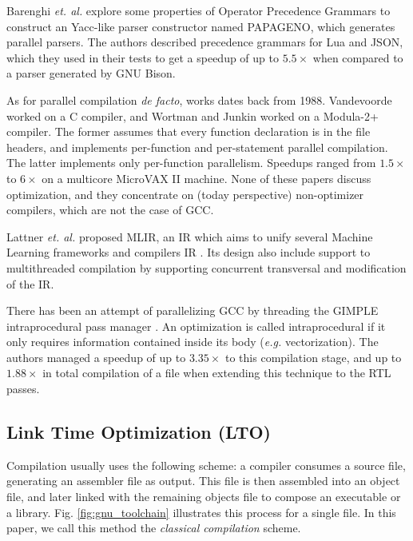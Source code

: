 \documentclass[runningheads]{llncs}
\begin{document}
Barenghi \textit{et. al.} \cite{Barenghi:2015:PPM:2839536.2840146} explore
some properties of Operator Precedence Grammars to construct an Yacc-like
parser constructor named PAPAGENO, which generates parallel parsers. The
authors described precedence grammars for Lua and JSON, which they used in
their tests to get a speedup of up to $5.5\times$ when compared to a parser
generated by GNU Bison.

As for parallel compilation \textit{de facto}, works dates back from 1988.
Vandevoorde \cite{vandevoorde1988parallel} worked on a C compiler, and Wortman
and Junkin \cite{wortman1992} worked on a Modula-2+ compiler.  The former
assumes that every function declaration is in the file headers, and implements
per-function and per-statement parallel compilation. The latter implements only
per-function parallelism.  Speedups ranged from $1.5\times$ to $6\times$ on a
multicore MicroVAX II machine. None of these papers discuss optimization, and
they concentrate on (today perspective) non-optimizer compilers, which are not
the case of GCC.

Lattner \emph{et. al.} proposed MLIR, an IR which aims to unify several
Machine Learning frameworks and compilers IR \cite{mlir}. Its design also include
support to multithreaded compilation by supporting concurrent transversal
and modification of the IR.

There has been an attempt of parallelizing GCC by threading the GIMPLE
intraprocedural pass manager \cite{bernardino2020improving}. An optimization is
called intraprocedural if it only requires information contained inside its
body (\textit{e.g.} vectorization). The authors managed a speedup of up to
$3.35\times$ to this compilation stage, and up to $1.88\times$ in total
compilation of a file when extending this technique to the RTL passes.

\subsection{Link Time Optimization (LTO)} \label{lto_section}

Compilation usually uses the following scheme: a compiler consumes a source file,
generating an assembler file as output. This file is then assembled into an object file,
and later linked with the remaining objects file to compose an executable or a library.
Fig. \ref{fig:gnu_toolchain} illustrates this process for a single file. In this paper,
we call this method the \emph{classical compilation} scheme.
\end{document}
